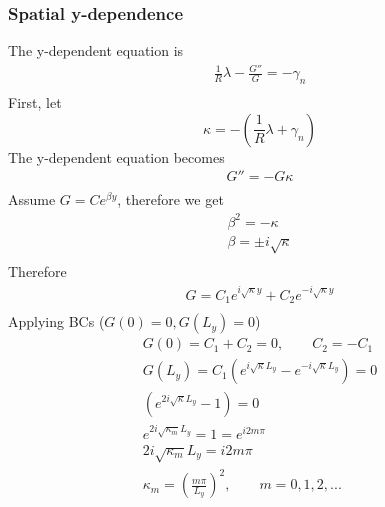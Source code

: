 \documentclass[11pt]{article}
\begin{document}
\subsubsection{Spatial y-dependence}
The y-dependent equation is
\begin{equation}\begin{aligned}
 \frac{1}{R} \lambda - \frac{G''}{G} = - \gamma_n \\
\end{aligned} \end{equation}
First, let
\begin{equation}
	\kappa = -\left( \frac{1}{R} \lambda + \gamma_n \right)
\end{equation}
The y-dependent equation becomes
\begin{equation}\begin{aligned}
 G'' = - G \kappa \\
\end{aligned} \end{equation}
Assume $G = C e^{\beta y}$, therefore we get
\begin{equation}\begin{aligned}
 \beta^2 = - \kappa \\
 \beta = \pm i \sqrt{\kappa} \\
\end{aligned} \end{equation}
Therefore
\begin{equation}\begin{aligned}
 G = C_1 e^{i\sqrt{\kappa} y} + C_2 e^{-i\sqrt{\kappa} y} \\
\end{aligned} \end{equation}
Applying BCs ($G(0)=0,G(L_y)=0$)
\begin{equation}\begin{aligned}
 G(0) = C_1 + C_2 = 0, \qquad C_2 = -C_1 \\
 G(L_y) = C_1 \left( e^{i\sqrt{\kappa} L_y} - e^{-i\sqrt{\kappa} L_y} \right) = 0 \\
              \left( e^{2i\sqrt{\kappa} L_y} - 1 \right) = 0 \\
              e^{2i\sqrt{\kappa_{m}} L_y} = 1 = e^{i2m\pi} \\
 2i\sqrt{\kappa_{m}} L_y = i2m\pi \\
 \kappa_{m} = \left( \frac{m\pi}{L_y} \right)^2, \qquad m=0,1,2,... \\
\end{aligned} \end{equation}
\end{document}
